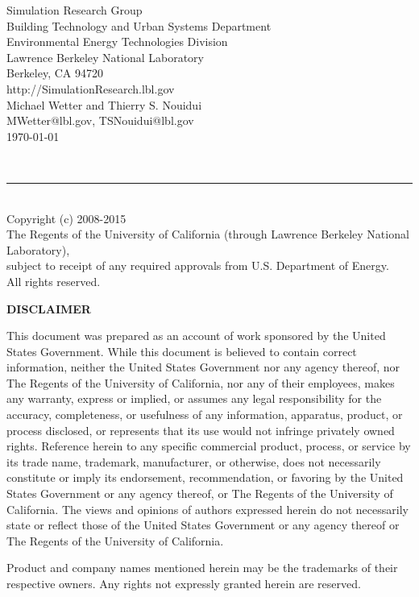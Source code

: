 \documentclass[11pt]{report}
\renewcommand{\date}{\today}
\begin{document}
\begin{titlepage}
\begin{minipage}{\headwidth}
\begin{center}
\large{Simulation Research Group}\\
\large{Building Technology and Urban Systems Department}\\
 \large{Environmental
Energy Technologies Division}\\
\large{Lawrence Berkeley National
Laboratory}\\
\large{Berkeley, CA 94720}
\\[10mm]
\large{http://SimulationResearch.lbl.gov}
\\[10mm]
\large{Michael Wetter and Thierry S. Nouidui}\\
\large{MWetter@lbl.gov, TSNouidui@lbl.gov}
\\[10mm]
\large{\date}
\\[40mm]
\end{center}
~\\[15mm]
\hrule
~\\[2mm]
Copyright (c) 2008-2015\\
The Regents of the University of California 
(through Lawrence Berkeley National Laboratory),\\
subject to receipt of any required approvals from U.S. Department of Energy.\\
All rights reserved.
\end{minipage}
\end{titlepage}

\begin{center}
\bf \Large DISCLAIMER
\end{center}
This document was prepared as an account of work sponsored by the United States
Government. While this document is believed to contain correct information, neither the
United States Government nor any agency thereof, nor The Regents of the University of
California, nor any of their employees, makes any warranty, express or implied, or assumes
any legal responsibility for the accuracy, completeness, or usefulness of any information,
apparatus, product, or process disclosed, or represents that its use would not infringe
privately owned rights. Reference herein to any specific commercial product, process, or
service by its trade name, trademark, manufacturer, or otherwise, does not necessarily
constitute or imply its endorsement, recommendation, or favoring by the United States
Government or any agency thereof, or The Regents of the University of California. The
views and opinions of authors expressed herein do not necessarily state or reflect those of the
United States Government or any agency thereof or The Regents of the University of
California.

\vfill
\small{\vspace{2mm} \noindent Product and company names mentioned herein may be the trademarks of their respective owners. Any rights not expressly granted herein are reserved.}
\end{document}
